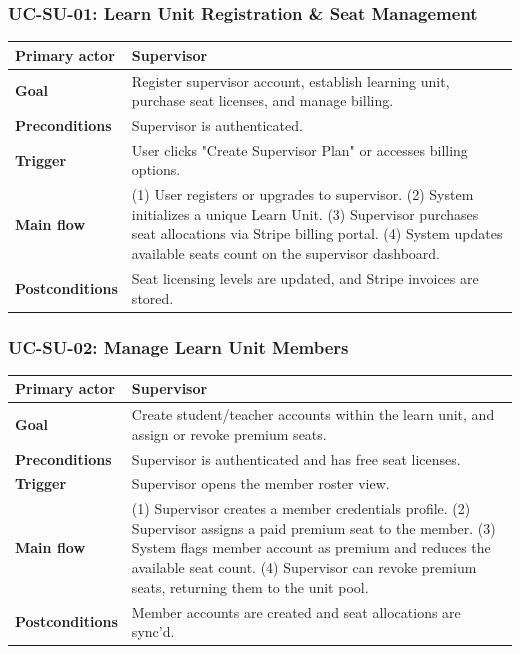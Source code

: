 \subsubsection{UC-SU-01: Learn Unit Registration \& Seat Management}
\begin{longtable}{L{0.28\textwidth}L{0.62\textwidth}}
\textbf{Primary actor} & Supervisor \\ \hline
\textbf{Goal} & Register supervisor account, establish learning unit, purchase seat licenses, and manage billing. \\ \hline
\textbf{Preconditions} & Supervisor is authenticated. \\ \hline
\textbf{Trigger} & User clicks "Create Supervisor Plan" or accesses billing options. \\ \hline
\textbf{Main flow} & (1) User registers or upgrades to supervisor. (2) System initializes a unique Learn Unit. (3) Supervisor purchases seat allocations via Stripe billing portal. (4) System updates available seats count on the supervisor dashboard. \\ \hline
\textbf{Postconditions} & Seat licensing levels are updated, and Stripe invoices are stored. \\
\end{longtable}

\subsubsection{UC-SU-02: Manage Learn Unit Members}
\begin{longtable}{L{0.28\textwidth}L{0.62\textwidth}}
\textbf{Primary actor} & Supervisor \\ \hline
\textbf{Goal} & Create student/teacher accounts within the learn unit, and assign or revoke premium seats. \\ \hline
\textbf{Preconditions} & Supervisor is authenticated and has free seat licenses. \\ \hline
\textbf{Trigger} & Supervisor opens the member roster view. \\ \hline
\textbf{Main flow} & (1) Supervisor creates a member credentials profile. (2) Supervisor assigns a paid premium seat to the member. (3) System flags member account as premium and reduces the available seat count. (4) Supervisor can revoke premium seats, returning them to the unit pool. \\ \hline
\textbf{Postconditions} & Member accounts are created and seat allocations are sync'd. \\
\end{longtable}

